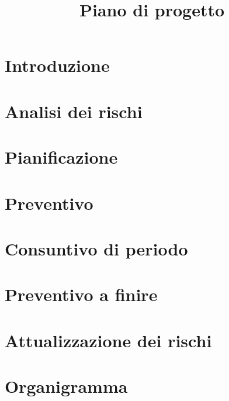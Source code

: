 \documentclass{article}
\title{Piano di progetto}
\begin{document}


\section{Introduzione}%
\label{sec:introduzione}

\newpage
\section{Analisi dei rischi}%
\label{sec:analisi_dei_rischi}

\newpage
\section{Pianificazione}%
\label{sec:pianificazione}

\newpage
\section{Preventivo}%
\label{sec:preventivo}

\newpage
\section{Consuntivo di periodo}%
\label{sec:consuntivo_di_periodo}

\section{Preventivo a finire}%
\label{sec:preventivo_a_finire}

\newpage
\appendix
\section{Attualizzazione dei rischi}%
\label{sec:attualizzazione_dei_rischi}

\newpage
\section{Organigramma}%
\label{sec:organigramma}

\end{document}
